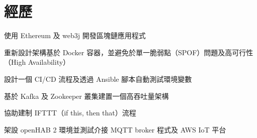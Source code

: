 \documentclass[]{deedy-resume-openfont-ch}
\begin{document}
%
%
\lastupdated

%
%

%
%

\begin{minipage}[t]{0.45\textwidth}



\section{經歷}

\vspace{\topsep} %
\begin{tightemize}
    \item 使用 Ethereum 及 web3j 開發區塊鏈應用程式
\end{tightemize}
\sectionsep

\begin{tightemize}
    \item 重新設計架構基於 Docker 容器，並避免於單一脆弱點（SPOF）問題及高可行性（High Availability）
    \item 設計一個 CI/CD 流程及透過 Ansible 腳本自動測試環境變數
    \item 基於 Kafka 及 Zookeeper 叢集建置一個高吞吐量架構
\end{tightemize}

\begin{tightemize}
    \item 協助建制 IFTTT（if this, then that）流程
    \item 架設 openHAB 2 環境並測試介接 MQTT broker 程式及 AWS IoT 平台
\end{tightemize}


\end{minipage}
\end{document}
